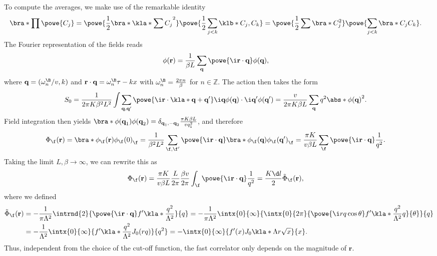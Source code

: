 \documentclass[english, parskip=full]{scrartcl}
\begin{document}
To compute the averages, we make use of the remarkable identity
\begin{align}
\bra*{\prod \powe{C_j}} &= \powe{\frac{1}{2}\bra*{\kla*{\sum C_j}^2}} \powe{\frac{1}{2} \sum_{j<k} \klb*{C_j,C_k}} = \powe{\frac{1}{2} \sum \bra*{C_j^2}} \powe{\sum_{j<k} \bra*{C_jC_k}}.
\end{align}
The Fourier representation of the fields reads
\begin{align}
\phi(\textbf{r}) &= \frac{1}{\beta L} \sum_\textbf{q} \powe{\i\textbf{r}\cdot\textbf{q}} \phi(\textbf{q}),
\end{align}
where $\textbf{q}=(\omega_n^\B/v, k)$ and $\textbf{r}\cdot\textbf{q} = \omega_n^\B \tau - kx$ with $\omega_n^\B = \frac{2\pi n}{\beta}$ for $n\in\mathbb{Z}$.
The action then takes the form
\begin{align}
S_0 &= \frac{1}{2\pi K \beta^2 L^2} \int \sum_{\textbf{q},\textbf{q}'} \powe{\i \textbf{r} \cdot \kla*{\textbf{q} + \textbf{q}'}} \i\textbf{q}\phi(\textbf{q}) \cdot \i\textbf{q}' \phi(\textbf{q}') = \frac{v}{2\pi K\beta L} \sum_\textbf{q} q^2 \abs*{\phi(\textbf{q})}^2.
\end{align}
Field integration then yields $\bra*{\phi(\textbf{q}_1) \phi(\textbf{q}_2)} = \delta_{\textbf{q}_1,-\textbf{q}_2} \frac{\pi K\beta L}{vq_1^2}$, and therefore
\begin{align}
\Phi_\f(\textbf{r}) &= \bra*{\phi_\f(\textbf{r})\phi_\f(0)}_\f = \frac{1}{\beta^2L^2} \sum_{\f,\f'} \powe{\i\textbf{r}\cdot \textbf{q}} \bra*{\phi_\f(\textbf{q})\phi_\f(\textbf{q}')}_\f = \frac{\pi K}{v\beta L} \sum_\f \powe{\i\textbf{r}\cdot \textbf{q}} \frac{1}{q^2}.
\end{align}
Taking the limit $L,\beta\rightarrow\infty$, we can rewrite this as
\begin{align}
\Phi_\f(\textbf{r}) &= \frac{\pi K}{v\beta L} \frac{L}{2\pi} \frac{\beta v}{2\pi} \int_\f \powe{\i\textbf{r}\cdot \textbf{q}} \frac{1}{q^2} = \frac{K\d l}{2} \tilde{\Phi}_\f(\textbf{r}),
\end{align}
where we defined
\begin{align}
\tilde{\Phi}_\f(\textbf{r}) &= -\frac{1}{\pi\Lambda^2} \intrnd{2}{\powe{\i\textbf{r}\cdot \textbf{q}} f'\kla*{\frac{q^2}{\Lambda^2}}}{q} = -\frac{1}{\pi \Lambda^2} \intx{0}{\infty}{ \intx{0}{2\pi}{ \powe{\i rq\cos\theta} f'\kla*{\frac{q^2}{\Lambda^2}}q }{\theta} }{q} \\
&= -\frac{1}{\Lambda^2}  \intx{0}{\infty}{f'\kla*{\frac{q^2}{\Lambda^2}} J_0(rq)}{q^2} = -\intx{0}{\infty}{ f'(x) J_0\kla*{\Lambda r \sqrt{x}} }{x}.
\end{align}
Thus, independent from the choice of the cut-off function, the fast correlator only depends on the magnitude of $\textbf{r}$.
\end{document}
